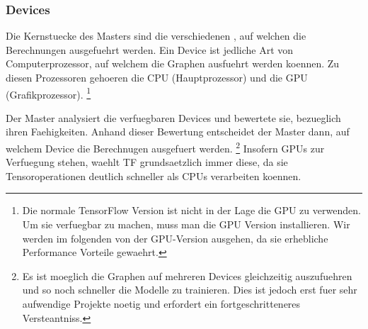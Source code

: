 \subsubsection{Devices}
Die Kernstuecke des Masters sind die verschiedenen , auf
welchen die Berechnungen ausgefuehrt werden. Ein Device ist jedliche Art von
Computerprozessor, auf welchem die Graphen ausfuehrt werden koennen.
Zu diesen Prozessoren gehoeren die CPU (Hauptprozessor) und die GPU (Grafikprozessor).
\footnote{
  Die normale TensorFlow Version ist nicht in der Lage die GPU zu verwenden. Um
  sie verfuegbar zu machen, muss man die GPU Version installieren. Wir werden im folgenden
  von der GPU-Version ausgehen, da sie erhebliche Performance Vorteile gewaehrt.
}
\para{}

Der Master analysiert die verfuegbaren Devices und bewertete sie, bezueglich
ihren Faehigkeiten. Anhand dieser Bewertung entscheidet der Master dann, auf
welchem Device die Berechnugen ausgefuert werden.
\footnote{
  Es ist moeglich die Graphen auf mehreren Devices gleichzeitig auszufuehren und
  so noch schneller die Modelle zu trainieren. Dies ist jedoch erst fuer sehr
  aufwendige Projekte noetig und erfordert ein fortgeschritteneres Versteantniss.
}
Insofern GPUs zur Verfuegung stehen, waehlt TF grundsaetzlich immer diese, da
sie Tensoroperationen deutlich schneller als CPUs verarbeiten koennen.

